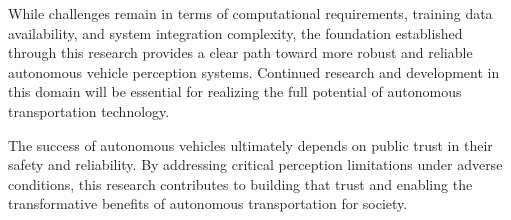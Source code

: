 While challenges remain in terms of computational requirements, training data availability, and system integration complexity, the foundation established through this research provides a clear path toward more robust and reliable autonomous vehicle perception systems. Continued research and development in this domain will be essential for realizing the full potential of autonomous transportation technology.

The success of autonomous vehicles ultimately depends on public trust in their safety and reliability. By addressing critical perception limitations under adverse conditions, this research contributes to building that trust and enabling the transformative benefits of autonomous transportation for society.

